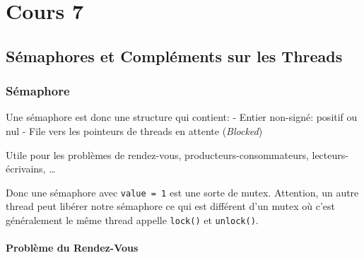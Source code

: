 \section{Cours 7}\label{cours-7}

\subsection{Sémaphores et Compléments sur les
Threads}\label{suxe9maphores-et-compluxe9ments-sur-les-threads}

\subsubsection{Sémaphore}\label{suxe9maphore}

Une sémaphore est donc une structure qui contient: - Entier non-signé:
positif ou nul - File vers les pointeurs de threads en attente
(\emph{Blocked})

\begin{Shaded}
\begin{Highlighting}[]
\PreprocessorTok{ }
\OperatorTok{(}\OperatorTok{*}\OperatorTok{,} \OperatorTok{,}  \OperatorTok{);} 
\OperatorTok{(}\OperatorTok{*}\OperatorTok{);} 
\OperatorTok{(}\OperatorTok{*}\OperatorTok{);} 
\OperatorTok{(}\OperatorTok{*}\OperatorTok{);} 
\end{Highlighting}
\end{Shaded}

Utile pour les problèmes de rendez-vous, producteurs-consommateurs,
lecteurs-écrivains, \ldots{}

Donc une sémaphore avec \texttt{value\ =\ 1} est une sorte de mutex.
Attention, un autre thread peut libérer notre sémaphore ce qui est
différent d'un mutex où c'est généralement le même thread appelle
\texttt{lock()} et \texttt{unlock()}.

\paragraph{Problème du Rendez-Vous}\label{probluxe8me-du-rendez-vous}

